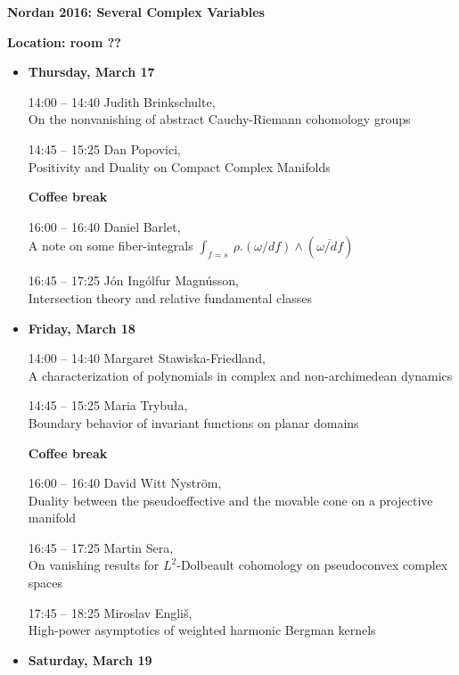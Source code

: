 \documentclass[12pt]{article}
\begin{document}
\pagestyle{empty}

\centerline{\Large \bf Nordan 2016: Several Complex Variables}
\vspace{3mm}

\centerline{\large \bf Location: room ??}


\begin{itemize}


\item {\bf Thursday, March 17}

14:00 -- 14:40  Judith Brinkschulte, \\
On the nonvanishing of abstract  Cauchy-Riemann cohomology groups

14:45 -- 15:25  Dan Popovici, \\ Positivity and Duality on Compact
Complex Manifolds


{\bf Coffee break}

16:00 -- 16:40   Daniel Barlet,  \\A note on  some fiber-integrals
$\int_{f = s}\   \rho.(\omega/df)\wedge(\overline{\omega/df})$

16:45  -- 17:25  J\'on Ing\'olfur Magn\'usson, \\ Intersection theory
and relative fundamental classes 


\item {\bf Friday, March 18}

14:00 -- 14:40 Margaret Stawiska-Friedland, \\
A characterization of polynomials in complex and non-archimedean dynamics

14:45 -- 15:25   Maria Trybu{\l}a,\\
Boundary behavior of invariant functions on planar domains

{\bf Coffee break}

16:00 -- 16:40  David Witt Nystr\"om, \\
Duality between the pseudoeffective and the movable cone on a
  projective manifold


16:45  -- 17:25    Martin Sera, \\
On vanishing results for $L^2$-Dolbeault cohomology on pseudoconvex
complex spaces

\vspace{3mm}

17:45 -- 18:25  Miroslav Engli{\v s}, \\
High-power asymptotics of weighted harmonic Bergman kernels

\item {\bf Saturday, March 19}


\end{itemize}
\end{document}
